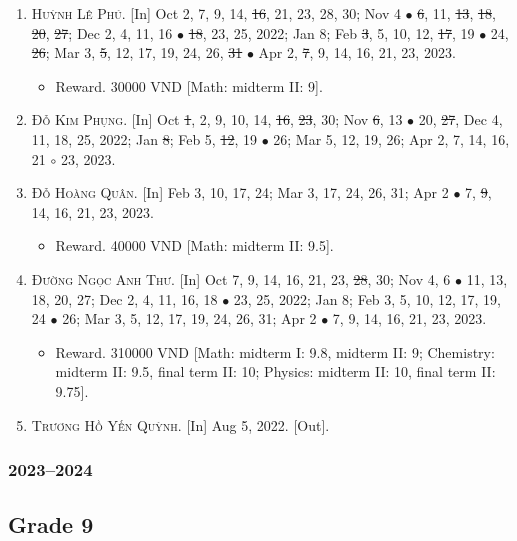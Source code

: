 \documentclass{article}
\begin{document}
\begin{enumerate}
\begin{itemize}
	\end{itemize}
	\item \textsc{Huỳnh Lê Phú.} \textsf{[In]} Oct 2, 7, 9, 14, \st{16}, 21, 23, 28, 30; Nov 4 $\bullet$ \st{6}, 11, \st{13}, \st{18}, \st{20}, \st{27}; Dec 2, 4, 11, 16 $\bullet$ \st{18}, 23, 25, 2022; Jan 8; Feb \st{3}, 5, 10, 12, \st{17}, 19 $\bullet$ 24, \st{26}; Mar 3, \st{5}, 12, 17, 19, 24, 26, \st{31} $\bullet$ Apr 2, \st{7}, 9, 14, 16, 21, 23, 2023.
	\begin{itemize}
		\item \textsf{Reward.} 30000 VND [Math: midterm II: 9].
	\end{itemize}
	\item \textsc{Đỗ Kim Phụng.} \textsf{[In]} Oct \st{1}, 2, 9, 10, 14, \st{16}, \st{23}, 30; Nov \st{6}, 13 $\bullet$ 20, \st{27}, Dec 4, 11, 18, 25, 2022; Jan \st{8}; Feb 5, \st{12}, 19 $\bullet$ 26; Mar 5, 12, 19, 26; Apr 2, 7, 14, 16, 21 $\circ$ 23, 2023.
	\item \textsc{Đỗ Hoàng Quân.} \textsf{[In]} Feb 3, 10, 17, 24; Mar 3, 17, 24, 26, 31; Apr 2 $\bullet$ 7, \st{9}, 14, 16, 21, 23, 2023.
	\begin{itemize}
		\item \textsf{Reward.} 40000 VND [Math: midterm II: 9.5].
	\end{itemize}
	\item \textsc{Đường Ngọc Anh Thư.} \textsf{[In]} Oct 7, 9, 14, 16, 21, 23, \st{28}, 30; Nov 4, 6 $\bullet$ 11, 13, 18, 20, 27; Dec 2, 4, 11, 16, 18 $\bullet$ 23, 25, 2022; Jan 8; Feb 3, 5, 10, 12, 17, 19, 24 $\bullet$ 26; Mar 3, 5, 12, 17, 19, 24, 26, 31; Apr 2 $\bullet$ 7, 9, 14, 16, 21, 23, 2023.
	\begin{itemize}
		\item \textsf{Reward.} 310000 VND [Math: midterm I: 9.8, midterm II: 9; Chemistry: midterm II: 9.5, final term II: 10; Physics: midterm II: 10, final term II: 9.75].
	\end{itemize}
	\item \textsc{Trương Hồ Yến Quỳnh.} \textsf{[In]} Aug 5, 2022. \textsf{[Out]}.
\end{enumerate}

\subsubsection{2023--2024}


\subsection{Grade 9}
\end{document}
